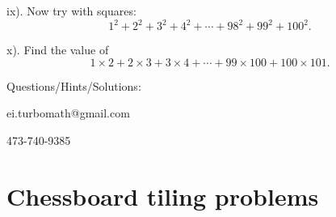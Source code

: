 
ix). Now try with squares: $$1^2+2^2+3^2+4^2+\cdots +98^2+99^2+100^2.$$


x). Find the value of $$1\times2+2\times3+3\times4+\cdots +99\times100+100\times101.$$



\vspace{.5cm}
\begin{flushright}
Questions/Hints/Solutions: 

ei.turbomath@gmail.com

473-740-9385
\end{flushright}

\newpage

\section*{Chessboard tiling problems}

